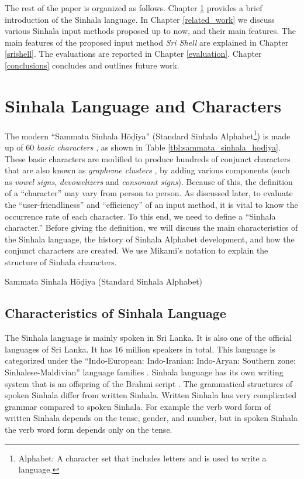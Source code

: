 \documentclass[english]{jnlp_1.3e}
\begin{document}
The rest of the paper is organized as follows.
Chapter \ref{sinhala_language} provides a brief introduction of  the  Sinhala language.
In Chapter \ref{related_work} we  discuss various  Sinhala input methods proposed up to now, and their main features.
The main features of the proposed input method {\it Sri Shell}  are  explained in Chapter \ref{srishell}.
The evaluations are reported in Chapter \ref{evaluation}.
Chapter \ref{conclusions} concludes and  outlines  future work.



  \section{Sinhala Language and Characters}
\label{sinhala_language}

The  modern ``Sammata Sinhala H\={o}\d{d}iya'' (Standard Sinhala Alphabet\footnote{ Alphabet: A character set that includes letters and is used to write a language.})
 is made up of 60  {\it basic characters} \cite{Unicode}, as shown in Table \ref{tbl:sammata_sinhala_hodiya}. 
These  basic characters  are modified to produce hundreds of conjunct characters   that  are also known as  {\it grapheme clusters}  \cite{Unicode}, by adding various components (such as  {\it vowel signs}, {\it devowelizers} and {\it consonant signs}). 
Because of this,  the  definition of a  ``character''  may vary from person to person. 
As discussed later, to evaluate the ``user-friendliness'' and ``efficiency'' of an input method, it is vital to know the occurrence rate of each character. 
 To this end, we need to  define a  ``Sinhala character.'' 
 Before giving the definition, we  will  discuss the main characteristics of  the  Sinhala language, the history of Sinhala Alphabet development, and how the conjunct characters are created. 
We use Mikami's notation \cite{codes} to explain the structure of Sinhala  characters.


\begin{table}[t]
\caption{Sammata Sinhala H\={o}\d{d}iya (Standard Sinhala Alphabet)}
\label{tbl:sammata_sinhala_hodiya}

\end{table}

\subsection{Characteristics of Sinhala Language}

 The  Sinhala language is mainly spoken in Sri Lanka.
It is also one of the official languages of Sri Lanka. 
It has 16 million speakers in total. 
This language is categorized under the ``Indo-European: Indo-Iranian: Indo-Aryan: Southern zone: Sinhalese-Maldivian'' language families \cite{family}. 
Sinhala language has its own writing system  that  is an offspring of the Brahmi script \cite{codes}.
The grammatical structures of spoken Sinhala differ from written Sinhala. 
Written Sinhala has very complicated grammar compared to spoken Sinhala. 
For example the verb  word form  of written Sinhala depends on the tense, gender, and number, 
but in spoken Sinhala the verb  word form  depends only on the tense. 
\end{document}
